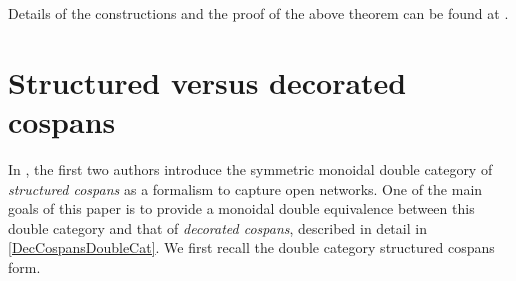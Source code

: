 \documentclass[reqno]{amsart}
\begin{document}
Details of the constructions and the proof of the above theorem can be found at \cite{CourserThesis}.








\section{Structured versus decorated cospans} \label{EquivDoubleCats}

In \cite{BC2}, the first two authors introduce the symmetric monoidal double category of \emph{structured cospans} as a formalism to capture open networks. One of the main goals of this paper is to provide a monoidal double equivalence between this double category and that of \emph{decorated cospans}, described in detail in \cref{DecCospansDoubleCat}. We first recall the double category structured cospans form.
\end{document}
